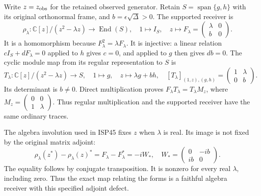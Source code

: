 \documentclass[
  10pt,
  a4paper,
]{article}
\begin{document}
Write \(z=z_{\rm obs}\) for the retained observed generator. Retain
\(S=\operatorname{span}\{g,h\}\) with its original orthonormal frame,
and \(b=\epsilon\sqrt\Delta>0\). The supported receiver is \[
\rho_\lambda:\mathbb C[z]/(z^2-\lambda z)\longrightarrow\operatorname{End}(S),
\quad 1\mapsto I_S,\quad z\mapsto F_\lambda=
\begin{pmatrix}\lambda&0\\b&0\end{pmatrix}.
\tag{ISP46}
\] It is a homomorphism because \(F_\lambda^2=\lambda F_\lambda\). It is
injective: a linear relation \(cI_S+dF_\lambda=0\) applied to \(h\)
gives \(c=0\), and applied to \(g\) then gives \(db=0\). The cyclic
module map from its regular representation to \(S\) is \[
T_\lambda:\mathbb C[z]/(z^2-\lambda z)\longrightarrow S,
\quad 1\mapsto g,\quad z\mapsto\lambda g+bh,
\quad [T_\lambda]_{(1,z),(g,h)}=
\begin{pmatrix}1&\lambda\\0&b\end{pmatrix}.
\tag{ISP47}
\] Its determinant is \(b\ne0\). Direct multiplication proves
\(F_\lambda T_\lambda=T_\lambda M_z\), where
\(M_z=\left(\begin{smallmatrix}0&0\\1&\lambda\end{smallmatrix}\right)\).
Thus regular multiplication and the supported receiver have the same
ordinary traces.

The algebra involution used in ISP45 fixes \(z\) when \(\lambda\) is
real. Its image is not fixed by the original matrix adjoint: \[
\rho_\lambda(z^*)-\rho_\lambda(z)^*
=F_\lambda-F_\lambda^*=-iW_*,
\quad W_*=\begin{pmatrix}0&-ib\\ib&0\end{pmatrix}.
\tag{ISP48}
\] The equality follows by conjugate transposition. It is nonzero for
every real \(\lambda\), including zero. Thus the exact map relating the
forms is a faithful algebra receiver with this specified adjoint defect.
\end{document}
